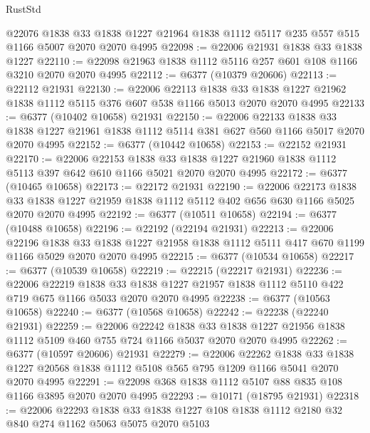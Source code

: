 \begin{lexlean}{RustStd}
\begin{coremodule}
    @22076
    @1838
    @33
    @1838
    @1227
    @21964
    @1838
    @1112
    @5117
    @235
    @557
    @515
    @1166
    @5007
    @2070
    @2070
    @4995
@22098 := @22006 @21931 @1838 @33 @1838 @1227
@22110 := @22098 @21963 @1838 @1112 @5116 @257 @601 @108 @1166 @3210 @2070 @2070 @4995
@22112 := @6377 (@10379 @20606)
@22113 := @22112 @21931
@22130 := @22006
    @22113
    @1838
    @33
    @1838
    @1227
    @21962
    @1838
    @1112
    @5115
    @376
    @607
    @538
    @1166
    @5013
    @2070
    @2070
    @4995
@22133 := @6377 (@10402 @10658) @21931
@22150 := @22006
    @22133
    @1838
    @33
    @1838
    @1227
    @21961
    @1838
    @1112
    @5114
    @381
    @627
    @560
    @1166
    @5017
    @2070
    @2070
    @4995
@22152 := @6377 (@10442 @10658)
@22153 := @22152 @21931
@22170 := @22006
    @22153
    @1838
    @33
    @1838
    @1227
    @21960
    @1838
    @1112
    @5113
    @397
    @642
    @610
    @1166
    @5021
    @2070
    @2070
    @4995
@22172 := @6377 (@10465 @10658)
@22173 := @22172 @21931
@22190 := @22006
    @22173
    @1838
    @33
    @1838
    @1227
    @21959
    @1838
    @1112
    @5112
    @402
    @656
    @630
    @1166
    @5025
    @2070
    @2070
    @4995
@22192 := @6377 (@10511 @10658)
@22194 := @6377 (@10488 @10658)
@22196 := @22192 (@22194 @21931)
@22213 := @22006
    @22196
    @1838
    @33
    @1838
    @1227
    @21958
    @1838
    @1112
    @5111
    @417
    @670
    @1199
    @1166
    @5029
    @2070
    @2070
    @4995
@22215 := @6377 (@10534 @10658)
@22217 := @6377 (@10539 @10658)
@22219 := @22215 (@22217 @21931)
@22236 := @22006
    @22219
    @1838
    @33
    @1838
    @1227
    @21957
    @1838
    @1112
    @5110
    @422
    @719
    @675
    @1166
    @5033
    @2070
    @2070
    @4995
@22238 := @6377 (@10563 @10658)
@22240 := @6377 (@10568 @10658)
@22242 := @22238 (@22240 @21931)
@22259 := @22006
    @22242
    @1838
    @33
    @1838
    @1227
    @21956
    @1838
    @1112
    @5109
    @460
    @755
    @724
    @1166
    @5037
    @2070
    @2070
    @4995
@22262 := @6377 (@10597 @20606) @21931
@22279 := @22006
    @22262
    @1838
    @33
    @1838
    @1227
    @20568
    @1838
    @1112
    @5108
    @565
    @795
    @1209
    @1166
    @5041
    @2070
    @2070
    @4995
@22291 := @22098 @368 @1838 @1112 @5107 @88 @835 @108 @1166 @3895 @2070 @2070 @4995
@22293 := @10171 (@18795 @21931)
@22318 := @22006
    @22293
    @1838
    @33
    @1838
    @1227
    @108
    @1838
    @1112
    @2180
    @32
    @840
    @274
    @1162
    @5063
    @5075
    @2070
    @5103

\end{coremodule}
\end{lexlean}
